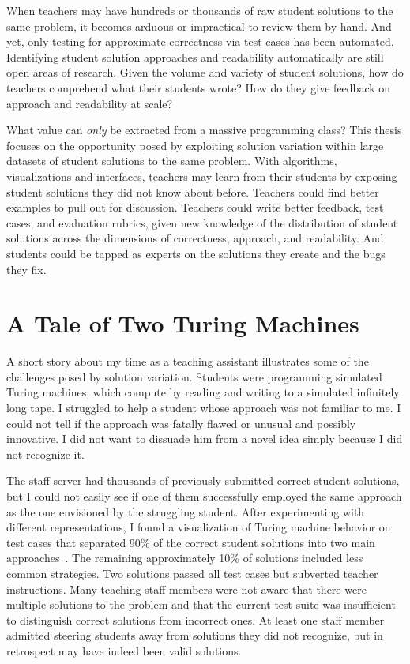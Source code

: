 When teachers may have hundreds or thousands of raw student solutions to the same problem, it becomes arduous or impractical to review them by hand. And yet, only testing for approximate correctness via test cases has been automated. Identifying student solution approaches and readability automatically are still open areas of research. Given the volume and variety of student solutions, how do teachers comprehend what their students wrote? How do they give feedback on approach and readability at scale? 

What value can {\it only} be extracted from a massive programming class? This thesis focuses on the opportunity posed by exploiting solution variation within large datasets of student solutions to the same problem. With algorithms, visualizations and interfaces, teachers may learn from their students by exposing student solutions they did not know about before. Teachers could find better examples to pull out for discussion. Teachers could write better feedback, test cases, and evaluation rubrics, given new knowledge of the distribution of student solutions across the dimensions of correctness, approach, and readability. And students could be tapped as experts on the solutions they create and the bugs they fix.

\section{A Tale of Two Turing Machines}

A short story about my time as a teaching assistant illustrates some of the challenges posed by solution variation. Students were programming simulated Turing machines, which compute by reading and writing to a simulated infinitely long tape. I struggled to help a student whose approach was not familiar to me. I could not tell if the approach was fatally flawed or unusual and possibly innovative. I did not want to dissuade him from a novel idea simply because I did not recognize it.

The staff server had thousands of previously submitted correct student solutions, but I could not easily see if one of them successfully employed the same approach as the one envisioned by the struggling student. After experimenting with different representations, I found a visualization of Turing machine behavior on test cases that separated 90\% of the correct student solutions into two main approaches~\cite{ICERGlassman}. The remaining approximately 10\% of solutions included less common strategies. Two solutions passed all test cases but subverted teacher instructions. Many teaching staff members were not aware that there were multiple solutions to the problem and that the current test suite was insufficient to distinguish correct solutions from incorrect ones. At least one staff member admitted steering students away from solutions they did not recognize, but in retrospect may have indeed been valid solutions.

